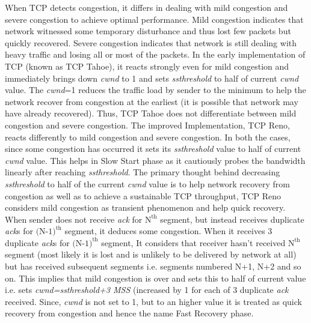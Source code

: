 \begin{multicols}{2}
When TCP detects congestion, it differs in dealing with mild congestion and severe congestion to achieve optimal performance.  Mild congestion indicates that network witnessed some temporary disturbance and thus lost few packets but quickly recovered. Severe congestion indicates that network is still dealing with heavy traffic and losing all or most of the packets. In the early implementation of TCP (known as TCP Tahoe), it reacts strongly even for mild congestion and immediately brings down \textit{cwnd} to 1 and sets \textit{ssthreshold} to half of current \textit{cwnd} value. The \textit{cwnd}=1 reduces the traffic load by sender to the minimum to help the network recover from congestion at the earliest (it is possible that network may have already recovered). Thus, TCP Tahoe does not differentiate between mild congestion and severe congestion. The improved Implementation, TCP Reno, reacts differently to mild congestion and severe congestion. In both the cases, since some congestion has occurred it sets its \textit{ssthreshold} value to half of current \textit{cwnd} value. This helps in Slow Start phase as it cautiously probes the bandwidth linearly after reaching \textit{ssthreshold}. The primary thought behind decreasing \textit{ssthreshold} to half of the current \textit{cwnd} value is to help network recovery from congestion as well as to achieve a sustainable TCP throughput, TCP Reno considers mild congestion as transient phenomenon and help quick recovery. When sender does not receive \textit{ack} for $\text{N}^{\text{th}}$ segment, but  instead receives duplicate \textit{ack}s for $\text{(N-1)}^{\text{th}}$ segment, it deduces some congestion. When it receives 3 duplicate \textit{ack}s for $\text{(N-1)}^{\text{th}}$  segment, It considers that receiver hasn’t received $\text{N}^{\text{th}}$ segment (most likely it is lost and is unlikely to be delivered by network at all) but has received subsequent segments i.e. segments numbered N+1, N+2 and so on. This implies that mild congestion is over and sets this to half of current value i.e. sets \textit{cwnd=ssthreshold+3 MSS} (increased by 1 for each of 3 duplicate \textit{ack} received. Since, \textit{cwnd} is not set to 1, but to an higher value it is treated as quick recovery from congestion and hence the name Fast Recovery phase.


\end{multicols}
